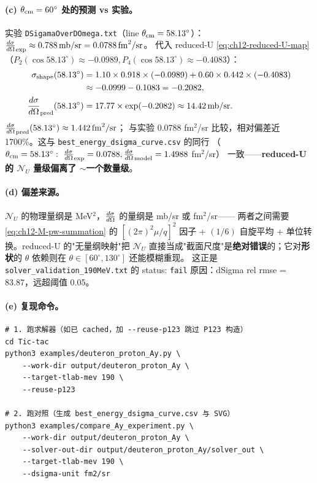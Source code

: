 \begin{numericalbox}[label={box:ch12-numerical-closure}]
\paragraph{(c) \(\theta_{\rm cm} = 60^\circ\) 处的预测 vs 实验。}
实验 \texttt{DSigamaOverDOmega.txt}（line \(\theta_{\rm cm} = 58.13^\circ\)）：
\(\frac{d\sigma}{d\Omega}_{\rm exp} \approx 0.788\,\text{mb/sr} = 0.0788\,\text{fm}^2/\text{sr}\)。
代入 reduced-U \cref{eq:ch12-reduced-U-map}（\(P_2(\cos 58.13^\circ) \approx -0.0989,
P_4(\cos 58.13^\circ) \approx -0.4083\)）：
\begin{align*}
\sigma_{\rm shape}(58.13^\circ)
&= 1.10 \times 0.918 \times (-0.0989) + 0.60 \times 0.442 \times (-0.4083) \\
&\approx -0.0999 - 0.1083 = -0.2082, \\
\frac{d\sigma}{d\Omega}_{\rm pred}(58.13^\circ)
&= 17.77 \times \exp(-0.2082) \approx 14.42\,\text{mb/sr}.
\end{align*}
\(\frac{d\sigma}{d\Omega}_{\rm pred}(58.13^\circ) \approx 1.442\,\text{fm}^2/\text{sr}\)；
与实验 0.0788 fm$^2$/sr 比较，相对偏差近 1700\%。这与 \texttt{best\_energy\_dsigma\_curve.csv} 的同行
（\(\theta_{\rm cm} = 58.13^\circ:\ \diffXS_{\rm exp} = 0.0788, \diffXS_{\rm model} = 1.4988\) fm\(^2\)/sr）
一致——\textbf{reduced-U 的 \(\mathcal{N}_U\) 量级偏离了 \(\sim\)一个数量级}。

\paragraph{(d) 偏差来源。}
\(\mathcal{N}_U\) 的物理量纲是 MeV\(^2\)，\(\frac{d\sigma}{d\Omega}\) 的量纲是 mb/sr 或 fm\(^2\)/sr——
两者之间需要 \cref{eq:ch12-M-pw-summation} 的 \([(2\pi)^2 \mu / q]^2\) 因子 +
\((1/6)\) 自旋平均 + 单位转换。reduced-U 的"无量纲映射"把
\(\mathcal{N}_U\) 直接当成"截面尺度"是\textbf{绝对错误}的；它对\textbf{形状}的
\(\theta\) 依赖则在 \(\theta \in [60^\circ, 130^\circ]\) 还能模糊重现。
这正是 \texttt{solver\_validation\_190MeV.txt} 的 status: \texttt{fail}
原因：dSigma rel rmse = 83.87，远超阈值 0.05。

\paragraph{(e) 复现命令。}
\begin{lstlisting}[style=config]
# 1. 跑求解器（如已 cached，加 --reuse-p123 跳过 P123 构造）
cd Tic-tac
python3 examples/deuteron_proton_Ay.py \
    --work-dir output/deuteron_proton_Ay \
    --target-tlab-mev 190 \
    --reuse-p123

# 2. 跑对照（生成 best_energy_dsigma_curve.csv 与 SVG）
python3 examples/compare_Ay_experiment.py \
    --work-dir output/deuteron_proton_Ay \
    --solver-out-dir output/deuteron_proton_Ay/solver_out \
    --target-tlab-mev 190 \
    --dsigma-unit fm2/sr


\end{lstlisting}
\end{numericalbox}
